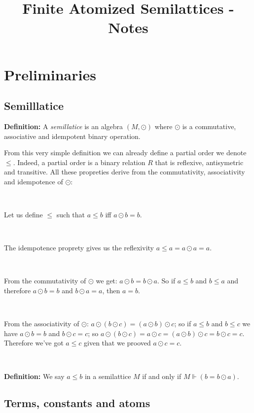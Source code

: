 \documentclass[a4paper, 11pt]{article}
\title{Finite Atomized Semilattices - Notes}
\begin{document}
\maketitle

\section{Preliminaries}

\subsection{Semilllatice}

\begin{tcolorbox} 
	\textbf{Definition:} A \textit{semillatice} is an algebra $(M,\odot)$ where $\odot$ is a commutative, associative and idempotent binary operation.
\end{tcolorbox}

From this very simple definition we can already define a partial order we denote $\leq$. Indeed, a partial order is a binary relation $R$ that is reflexive, antisymetric and transitive. All these propreties derive from the commutativity, associativity and idempotence of $\odot$:

\

Let us define $\leq$ such that $a\leq b$ iff $a \odot b = b$.

\

The idempotence proprety gives us the reflexivity $a \leq a = a \odot a = a$.  

\

From the commutativity of $\odot$ we get: $a \odot b = b \odot a$. So if $a \leq b$ and $b \leq a$ and therefore $a \odot b = b$ and $b \odot a = a$, then $a=b$.

\

From the associativity of $\odot$: $a \odot (b \odot c) = (a \odot b) \odot c$; so if $a \leq b$ and $b \leq c$ we have $a \odot b = b$ and $b \odot c = c$; so $a \odot (b \odot c) = a \odot c = (a \odot b) \odot c = b \odot c = c$. Therefore we've got $a \leq c$ given that we prooved $a \odot c = c$. 

\

\begin{tcolorbox} 
	\textbf{Definition:} We say $a \leq b$ in a semilattice $M$ if and only if $M \Vdash (b = b \odot a)$.
\end{tcolorbox}

\subsection{Terms, constants and atoms}
\end{document}

